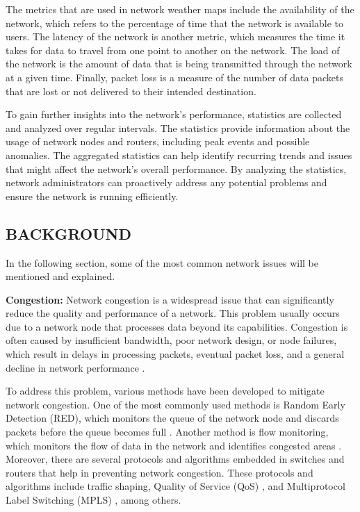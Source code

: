 \documentclass[sigconf,authorversion,nonacm]{acmart}
\begin{document}
The metrics that are used in network weather maps include the availability of the network, which refers to the percentage of time that the network is available to users. The latency of the network is another metric, which measures the time it takes for data to travel from one point to another on the network. The load of the network is the amount of data that is being transmitted through the network at a given time. Finally, packet loss is a measure of the number of data packets that are lost or not delivered to their intended destination.

To gain further insights into the network's performance, statistics are collected and analyzed over regular intervals. The statistics provide information about the usage of network nodes and routers, including peak events and possible anomalies. The aggregated statistics can help identify recurring trends and issues that might affect the network's overall performance. By analyzing the statistics, network administrators can proactively address any potential problems and ensure the network is running efficiently. 

\subsection{BACKGROUND}
In the following section, some of the most common network issues will be mentioned and explained. 


\textbf{Congestion:} Network congestion is a widespread issue that can significantly reduce the quality and performance of a network. This problem usually occurs due to a network node that processes data beyond its capabilities. Congestion is often caused by insufficient bandwidth, poor network design, or node failures, which result in delays in processing packets, eventual packet loss, and a general decline in network performance \cite{simulation}.

To address this problem, various methods have been developed to mitigate network congestion. One of the most commonly used methods is Random Early Detection (RED), which monitors the queue of the network node and discards packets before the queue becomes full \cite{10.1145/263105.263154}. Another method is flow monitoring, which monitors the flow of data in the network and identifies congested areas \cite{10.1145/3342280.3342305}. Moreover, there are several protocols and algorithms embedded in switches and routers that help in preventing network congestion. These protocols and algorithms include traffic shaping, Quality of Service (QoS) \cite{VanMieghem2003}, and Multiprotocol Label Switching (MPLS) \cite{Conte2003}, among others.
\end{document}
